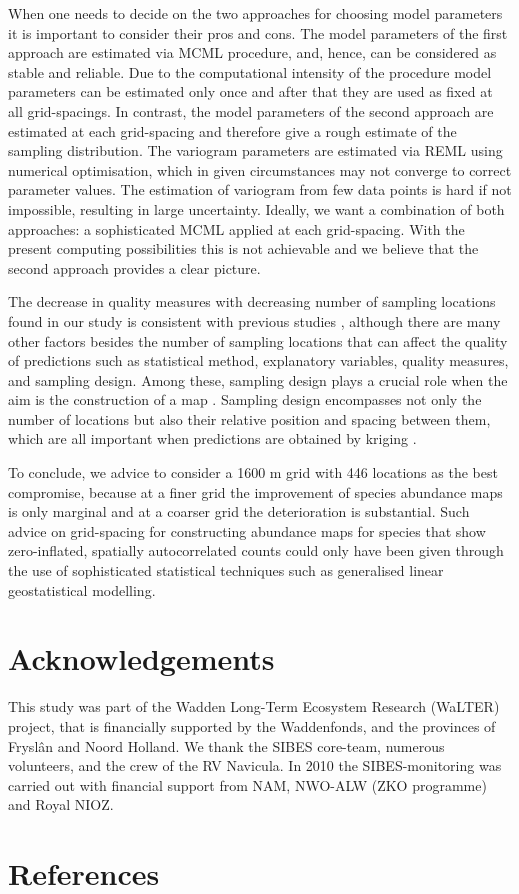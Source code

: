 \documentclass[review]{elsarticle}
\begin{document}
When one needs to decide on the two approaches for choosing model parameters it is important to consider their pros and cons.
The model parameters of the first approach are estimated via MCML procedure, and, hence, can be considered as stable and reliable.
Due to the computational intensity of the procedure model parameters can be estimated only once and after that they are used as fixed at all grid-spacings.
In contrast, the model parameters of the second approach are estimated at each grid-spacing and therefore give a rough estimate of the sampling distribution.
The variogram parameters are estimated via REML using numerical optimisation, which in given circumstances may not converge to correct parameter values.
The estimation of variogram from few data points is hard if not impossible, resulting in large uncertainty.
Ideally, we want a combination of both approaches: a sophisticated  MCML applied at each grid-spacing.
With the present computing possibilities this is not achievable and we believe that the second approach provides a clear picture.

The decrease in quality measures with decreasing number of sampling locations found in our study is consistent with previous studies \citep[e.g.][]{stockwell2002, wisz2008, hanberry2012}, although there are many other factors besides the number of sampling locations that can affect the quality of predictions such as statistical method, explanatory variables, quality measures, and sampling design.
Among these, sampling design plays a crucial role when the aim is the construction of a map \citep{vangroenigen2000}.
Sampling design encompasses not only the number of locations but also their relative position and spacing between them, which are all important when predictions are obtained by kriging \citep{fortin1989}.

To conclude, we advice to consider a 1600 m grid with 446 locations as the best compromise, because at a finer grid the improvement of species abundance maps is only marginal and at a coarser grid the deterioration is substantial.
Such advice on grid-spacing for constructing abundance maps for species that show zero-inflated, spatially autocorrelated counts could only have been given through the use of sophisticated statistical techniques such as generalised linear geostatistical modelling.

\section*{Acknowledgements}

This study was part of the Wadden Long-Term Ecosystem Research (WaLTER) project, that is financially supported by the Waddenfonds, and the provinces of Frysl\^{a}n and Noord Holland. We thank the SIBES core-team, numerous volunteers, and the crew of the RV Navicula.
In 2010 the SIBES-monitoring was carried out with financial support from NAM, NWO-ALW (ZKO programme) and Royal NIOZ.

\section*{References}

\end{document}
